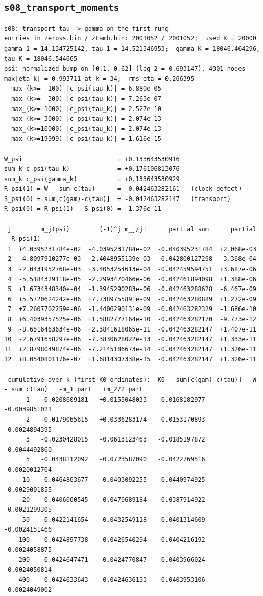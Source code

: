 \documentclass[11pt,reqno]{amsart}
\numberwithin{equation}{section}
\theoremstyle{plain}
\theoremstyle{definition}
\theoremstyle{remark}
\begin{document}
\subsection{\texttt{s08\_transport\_moments}}
\label{app:out-s08-transport-moments}

\begin{lstlisting}[style=out]
s08: transport tau -> gamma on the first rung
entries in zeross.bin / zLamb.bin: 2001052 / 2001052;  used K = 20000
gamma_1 = 14.134725142, tau_1 = 14.521346953;  gamma_K = 18046.464296, tau_K = 18046.544665
psi: normalized bump on [0.1, 0.62] (log 2 = 0.693147), 4001 nodes
max|eta_k| = 0.993711 at k = 34;  rms eta = 0.266395
  max_(k>=  100) |c_psi(tau_k)| = 6.880e-05
  max_(k>=  300) |c_psi(tau_k)| = 7.263e-07
  max_(k>= 1000) |c_psi(tau_k)| = 2.527e-10
  max_(k>= 3000) |c_psi(tau_k)| = 2.074e-13
  max_(k>=10000) |c_psi(tau_k)| = 2.074e-13
  max_(k>=19999) |c_psi(tau_k)| = 1.616e-15

W_psi                          = +0.133643530916
sum_k c_psi(tau_k)             = +0.176106813076
sum_k c_psi(gamma_k)           = +0.133643530929
R_psi(1) = W - sum c(tau)      = -0.042463282161   (clock defect)
S_psi(0) = sum[c(gam)-c(tau)]  = -0.042463282147   (transport)
R_psi(0) = R_psi(1) - S_psi(0) = -1.376e-11

 j        m_j(psi)        (-1)^j m_j/j!      partial sum      partial - R_psi(1)
 1  +4.0395231784e-02  -4.0395231784e-02  -0.040395231784  +2.068e-03
 2  -4.8097910277e-03  -2.4048955139e-03  -0.042800127298  -3.368e-04
 3  -2.0431952768e-03  +3.4053254613e-04  -0.042459594751  +3.687e-06
 4  -5.5184329118e-05  -2.2993470466e-06  -0.042461894098  +1.388e-06
 5  +1.6734348340e-04  -1.3945290283e-06  -0.042463288628  -6.467e-09
 6  +5.5720624242e-06  +7.7389755891e-09  -0.042463280889  +1.272e-09
 7  +7.2607702259e-06  -1.4406290131e-09  -0.042463282329  -1.686e-10
 8  +6.4039357525e-06  +1.5882777164e-10  -0.042463282170  -9.773e-12
 9  -8.6516463634e-06  +2.3841618065e-11  -0.042463282147  +1.407e-11
10  -2.6791658297e-06  -7.3830628022e-13  -0.042463282147  +1.333e-11
11  +2.8798049874e-06  -7.2145186673e-14  -0.042463282147  +1.326e-11
12  +8.0540801176e-07  +1.6814307338e-15  -0.042463282147  +1.326e-11

 cumulative over k (first K0 ordinates):  K0   sum[c(gam)-c(tau)]   W - sum c(tau)   -m_1 part   +m_2/2 part
      1   -0.0208609181   +0.0155048033   -0.0168182977   -0.0039851021
      2   -0.0179065615   +0.0336283174   -0.0153170893   -0.0024894395
      3   -0.0230428015   -0.0613123463   -0.0185197872   -0.0044492860
      5   -0.0438112092   -0.0723587090   -0.0422769516   -0.0020012704
     10   -0.0464863677   -0.0403092255   -0.0440974925   -0.0029001855
     20   -0.0406060545   -0.0470689184   -0.0387914922   -0.0021299305
     50   -0.0422141654   -0.0432549118   -0.0401314609   -0.0024151466
    100   -0.0424897738   -0.0426540294   -0.0404216192   -0.0024058875
    200   -0.0424647471   -0.0424770847   -0.0403966024   -0.0024050814
    400   -0.0424633643   -0.0424636133   -0.0403953106   -0.0024049002


\end{lstlisting}
\end{document}
